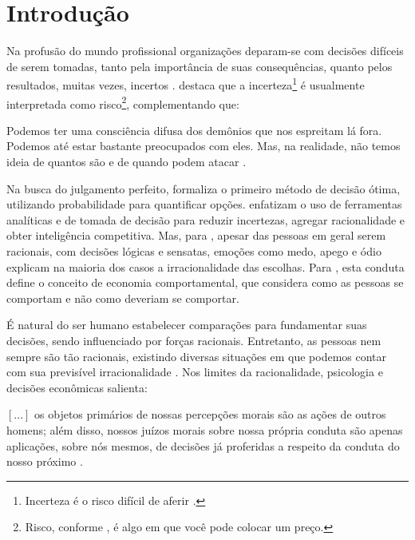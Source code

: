 \documentclass[
	article,			        %
	11pt,				          %
	oneside,			        %
	a4paper,			        %
	english,			        %
	brazil,				        %
	sumario=tradicional
]{abntex2}\usepackage[]{graphicx}\usepackage[]{color}
\begin{document}
\section*{Introdução}

Na profusão do mundo profissional organizações deparam-se com decisões difíceis de serem tomadas, tanto pela importância de suas consequências, quanto pelos resultados, muitas vezes, incertos \cite{Bekman.2009}.  destaca que a incerteza\footnote{Incerteza é o risco difícil de aferir \cite{Nate.2012}.} é usualmente interpretada como risco\footnote{Risco, conforme , é algo em que você pode colocar um preço.}, complementando que:

\begin{citacao}
  Podemos ter uma consciência difusa dos demônios que nos espreitam lá fora. Podemos até estar bastante preocupados com eles. Mas, na realidade, não temos ideia de quantos são e de quando podem atacar \cite{Nate.2012}.
\end{citacao}

Na busca do julgamento perfeito,  formaliza o primeiro método de decisão ótima, utilizando probabilidade para quantificar opções.  enfatizam o uso de ferramentas analíticas e de tomada de decisão para reduzir incertezas, agregar racionalidade e obter inteligência competitiva. Mas, para , apesar das pessoas em geral serem racionais, com decisões lógicas e sensatas, emoções como medo, apego e ódio explicam na maioria dos casos a irracionalidade das escolhas. Para , esta conduta define o conceito de economia comportamental, que considera como as pessoas se comportam e não como deveriam se comportar. 

É natural do ser humano estabelecer comparações para fundamentar suas decisões, sendo influenciado por forças racionais. Entretanto, as pessoas nem sempre são tão racionais, existindo diversas situações em que podemos contar com sua previsível irracionalidade \cite{Ariely.2012}. Nos limites da racionalidade, psicologia e decisões econômicas  salienta:

\begin{citacao}
$\left [ ... \right ]$ os objetos primários de nossas percepções morais são as ações de outros homens; além disso, nossos juízos morais sobre nossa própria conduta são apenas aplicações, sobre nós mesmos, de decisões já proferidas a respeito da conduta do nosso próximo \cite{Smith.1999}.
\end{citacao}
\end{document}
